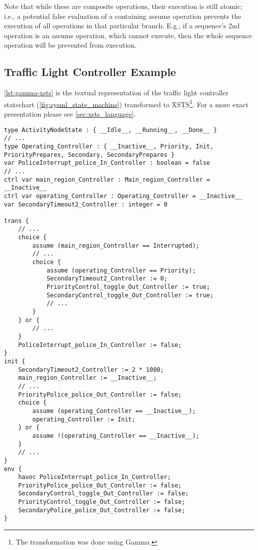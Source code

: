 Note that while these are composite operations, their execution is still atomic; i.e., a potential false evaluation of a containing assume operation prevents the execution of all operations in that particular branch. E.g., if a sequence's 2nd operation is an assume operation, which cannot execute, then the whole sequence operation will be prevented from execution.

\subsection{Traffic Light Controller Example}

\autoref{lst:gamma-xsts} is the textual representation of the traffic light controller statechart (\autoref{fig:sysml_state_machine}) transformed to XSTS\footnote{The transformation was done using Gamma.}. For a more exact presentation please see \autoref{sec:xsts_language}.

\begin{lstlisting}[float,language=xsts, caption={Gamma XSTS Language representing the traffic light controller statechart.}, label={lst:gamma-xsts}]
type ActivityNodeState : { __Idle__, __Running__, __Done__ }
// ...
type Operating_Controller : { __Inactive__, Priority, Init, PriorityPrepares, Secondary, SecondaryPrepares }
var PoliceInterrupt_police_In_Controller : boolean = false
// ...
ctrl var main_region_Controller : Main_region_Controller = __Inactive__
ctrl var operating_Controller : Operating_Controller = __Inactive__
var SecondaryTimeout2_Controller : integer = 0

trans {
	// ...
	choice {
		assume (main_region_Controller == Interrupted); 
		// ...
		choice {
			assume (operating_Controller == Priority);
			SecondaryTimeout2_Controller := 0;
			PriorityControl_toggle_Out_Controller := true;
			SecondaryControl_toggle_Out_Controller := true;
			// ...
		}
	} or {
		// ...
	}
	PoliceInterrupt_police_In_Controller := false;
}
init {
	SecondaryTimeout2_Controller := 2 * 1000;
	main_region_Controller := __Inactive__;
	// ...
	PriorityPolice_police_Out_Controller := false;
	choice {
		assume (operating_Controller == __Inactive__);
		operating_Controller := Init;
	} or {
		assume !(operating_Controller == __Inactive__);
	}
	// ...
}
env {
	havoc PoliceInterrupt_police_In_Controller;
	PriorityPolice_police_Out_Controller := false;
	SecondaryControl_toggle_Out_Controller := false;
	PriorityControl_toggle_Out_Controller := false;
	SecondaryPolice_police_Out_Controller := false;
}
\end{lstlisting}
